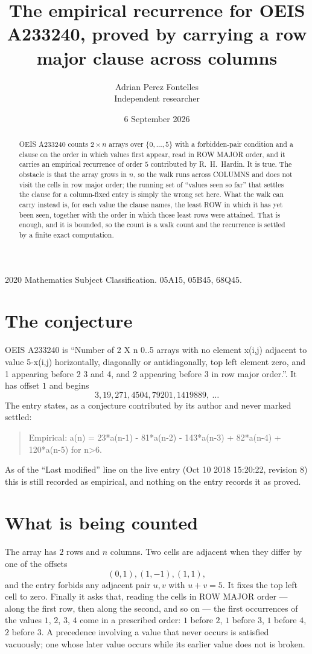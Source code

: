 \documentclass[11pt,a4paper]{article}
\title{The empirical recurrence for OEIS A233240, proved by carrying a row major clause across
columns}
\author{Adrian Perez Fontelles\\ \small Independent researcher}
\date{6 September 2026}
\theoremstyle{plain}
\theoremstyle{definition}
\begin{document}
\maketitle

\begin{abstract}
OEIS A233240 counts $2\times n$ arrays over $\{0,\dots,5\}$ with a forbidden-pair
condition and a clause on the order in which values first appear, read in ROW MAJOR order, and
it carries an empirical recurrence of order $5$ contributed by R.~H.~Hardin. It is true.
The obstacle is that the array grows in $n$, so the walk runs across COLUMNS and does not visit
the cells in row major order; the running set of ``values seen so far'' that settles the clause
for a column-fixed entry is simply the wrong set here. What the walk can carry instead is, for
each value the clause names, the least ROW in which it has yet been seen, together with the
order in which those least rows were attained. That is enough, and it is bounded, so the count
is a walk count and the recurrence is settled by a finite exact computation.
\end{abstract}

\noindent\small 2020 Mathematics Subject Classification. 05A15, 05B45, 68Q45.\normalsize

\section{The conjecture}

OEIS A233240 is ``Number of 2 X n 0..5 arrays with no element x(i,j) adjacent to value 5-x(i,j) horizontally, diagonally or antidiagonally, top left element zero, and 1 appearing before 2 3 and 4, and 2 appearing before 3 in row major order.''. It has offset $1$ and begins
\[
3, 19, 271, 4504, 79201, 1419889,\ \dots
\]
The entry states, as a conjecture contributed by its author and never marked settled:
\begin{quote}
Empirical: a(n) = 23*a(n-1) - 81*a(n-2) - 143*a(n-3) + 82*a(n-4) + 120*a(n-5) for n>6.
\end{quote}
As of the ``Last modified'' line on the live entry (Oct 10 2018 15:20:22, revision 8) this is still
recorded as empirical, and nothing on the entry records it as proved.

\section{What is being counted}

The array has $2$ rows and $n$ columns. Two cells are adjacent when they differ by one of the
offsets
\[
(0,1), (1,-1), (1,1),
\]
and the entry forbids any adjacent pair $u,v$ with $u+v=5$. It fixes the top left cell to
zero. Finally it asks that, reading the cells in ROW MAJOR order --- along the first row, then
along the second, and so on --- the first occurrences of the values $1$, $2$, $3$, $4$ come in a
prescribed order: $1$ before $2$, $1$ before $3$, $1$ before $4$, $2$ before $3$. A precedence involving a value that never occurs is satisfied
vacuously; one whose later value occurs while its earlier value does not is broken.
\end{document}
